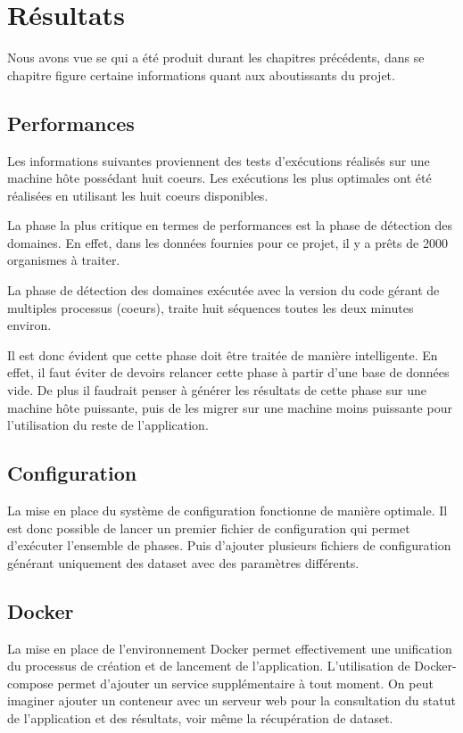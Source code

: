 \chapter{Résultats}
\label{ch:result}

Nous avons vue se qui a été produit durant les chapitres précédents, dans se chapitre figure certaine informations quant aux aboutissants du projet.

\section{Performances}
Les informations suivantes proviennent des tests d'exécutions réalisés sur une machine hôte possédant huit coeurs. Les exécutions les plus optimales ont été réalisées en utilisant les huit coeurs disponibles. 

La phase la plus critique en termes de performances est la phase de détection des domaines. En effet, dans les données fournies pour ce projet, il y a prêts de 2000 organismes à traiter.

La phase de détection des domaines exécutée avec la version du code gérant de multiples processus (coeurs), traite huit séquences toutes les deux minutes environ.

Il est donc évident que cette phase doit être traitée de manière intelligente. En effet, il faut éviter de devoirs relancer cette phase à partir d'une base de données vide. De plus il faudrait penser à générer les résultats de cette phase sur une machine hôte puissante, puis de les migrer sur une machine moins puissante pour l'utilisation du reste de l'application.

\section{Configuration}
La mise en place du système de configuration fonctionne de manière optimale. Il est donc possible de lancer un premier fichier de configuration qui permet d'exécuter l'ensemble de phases. Puis d'ajouter plusieurs fichiers de configuration générant uniquement des dataset avec des paramètres différents.

\section{Docker}
La mise en place de l'environnement Docker permet effectivement une unification du processus de création et de lancement de l'application. L'utilisation de Docker-compose permet d'ajouter un service supplémentaire à tout moment. On peut imaginer ajouter un conteneur avec un serveur web pour la consultation du statut de l'application et des résultats, voir même la récupération de dataset.

\cite{EinsteinPR1935}














